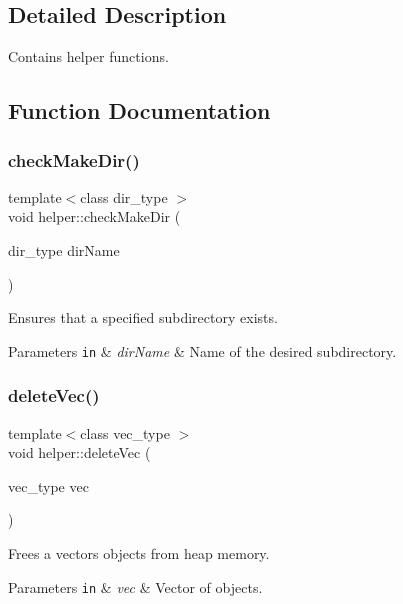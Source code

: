\subsection{Detailed Description}
Contains helper functions. 

\subsection{Function Documentation}
\mbox{\label{Helper_8hh_file_a54c684ce784017d4c61e9fc7a179be67}} 
\subsubsection{\texorpdfstring{check\+Make\+Dir()}{checkMakeDir()}}
{\footnotesize\ttfamily template$<$class dir\+\_\+type $>$ \\
void helper\+::check\+Make\+Dir (\begin{DoxyParamCaption}\item[{dir\+\_\+type}]{dir\+Name }\end{DoxyParamCaption})}

Ensures that a specified subdirectory exists. 
\begin{DoxyParams}[1]{Parameters}
\mbox{\tt in}  & {\em dir\+Name} & Name of the desired subdirectory. \\
\hline
\end{DoxyParams}
\mbox{\label{Helper_8hh_file_a4cfbf4be07fc1d320df3c06ab77ff469}} 
\subsubsection{\texorpdfstring{delete\+Vec()}{deleteVec()}}
{\footnotesize\ttfamily template$<$class vec\+\_\+type $>$ \\
void helper\+::delete\+Vec (\begin{DoxyParamCaption}\item[{vec\+\_\+type}]{vec }\end{DoxyParamCaption})}

Frees a vector\textquotesingle{}s objects from heap memory. 
\begin{DoxyParams}[1]{Parameters}
\mbox{\tt in}  & {\em vec} & Vector of objects. \\
\hline
\end{DoxyParams}
\mbox{\label{Helper_8hh_file_a204cd701ae182be7b10e2017e259285b}} 
